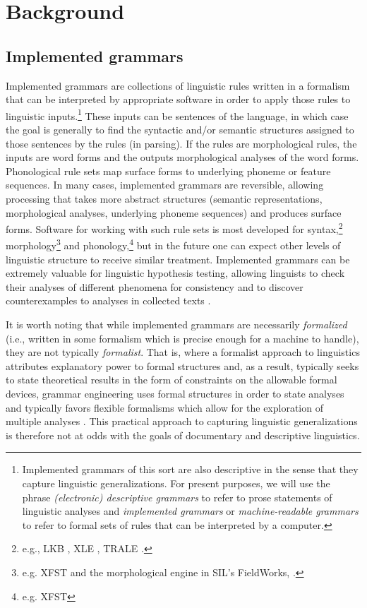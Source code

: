 \section{Background}
\label{sec:bg}

\subsection{Implemented grammars}
\label{sec:wmb}

Implemented grammars are collections of linguistic rules written in a
formalism that can be interpreted by appropriate software in order to
apply those rules to linguistic inputs.\footnote{Implemented grammars
  of this sort are also descriptive in the sense that they capture
  linguistic generalizations.  For present purposes, we will use the
  phrase {\it (electronic) descriptive grammars} to refer to prose
  statements of linguistic analyses and {\it implemented grammars} or
  {\it machine-readable grammars} to refer to formal sets of rules
  that can be interpreted by a computer.}  These inputs can be sentences of
the language, in which case the goal is generally to find the
syntactic and/or semantic structures assigned to those sentences by
the rules (in parsing).  If the rules are morphological rules, the
inputs are word forms and the outputs morphological analyses of the
word forms.  Phonological rule sets map surface forms to underlying
phoneme or feature sequences.  In many cases, implemented grammars are
reversible, allowing processing that takes more abstract structures
(semantic representations, morphological analyses, underlying phoneme
sequences) and produces surface forms.  Software for working with such
rule sets is most developed for syntax,\footnote{e.g., 
  LKB  \citep{Copestake:02},
  XLE \citep{xle}, 
  TRALE \citep{Meu:Pen:Ric:02}.
}
morphology\footnote{e.g.
 XFST\citep{Bee:Kar:03} and the morphological engine in SIL's FieldWorks,
\citep{Bla:Sim:08}.
} and phonology,\footnote{e.g. XFST} but in the future one
can expect other levels of linguistic structure to receive similar
treatment.  Implemented grammars can be extremely valuable for
linguistic hypothesis testing, allowing linguists to check their
analyses of different phenomena for consistency
\citep{Bierwisch:63,Mueller:99,Bender:08,Ben:Fli:Oep:11} and to
discover counterexamples to analyses in collected texts
\citep{Bal:Bea:Ben:Fli:Kim:Oep:05}.

It is worth noting that while implemented grammars are necessarily
{\it formalized} (i.e., written in some formalism which is precise
enough for a machine to handle), they are not typically {\it
  formalist}.  That is, where a formalist approach to linguistics
attributes explanatory power to formal structures and, as a result,
typically seeks to state theoretical results in the form of
constraints on the allowable formal devices, grammar engineering uses
formal structures in order to state analyses and typically favors
flexible formalisms which allow for the exploration of multiple
analyses \citep{Ben:Fli:Oep:11}.  This practical approach to capturing
linguistic generalizations is therefore not at odds with the goals of
documentary and descriptive linguistics.

